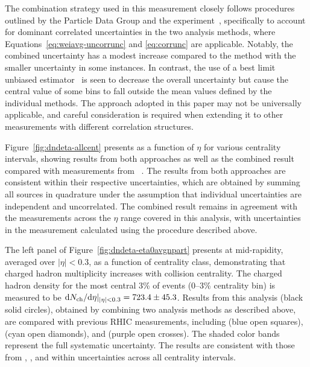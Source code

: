 The combination strategy used in this measurement closely follows procedures outlined by the Particle Data Group and the \cms experiment~\cite{ParticleDataGroup:2024cfk, CMS:2011aqh}, specifically to account for dominant correlated uncertainties in the two analysis methods, where Equations~\ref{eq:weiavg-uncorrunc} and \ref{eq:corrunc} are applicable. Notably, the combined uncertainty has a modest increase compared to the method with the smaller uncertainty in some instances. In contrast, the use of a best limit unbiased estimator~\cite{5f88760e-8167-31ed-9022-4d8c4dafd76a} is seen to decrease the overall uncertainty but cause the central value of some bins to fall outside the mean values defined by the individual methods. The approach adopted in this paper may not be universally applicable, and careful consideration is required when extending it to other measurements with different correlation structures.

Figure~\ref{fig:dndeta-allcent} presents \dndeta as a function of $\eta$ for various centrality intervals, showing results from both approaches as well as the combined result compared with measurements from \phobos~\cite{PHOBOS:2010eyu}. The results from both approaches are consistent within their respective uncertainties, which are obtained by summing all sources in quadrature under the assumption that individual uncertainties are independent and uncorrelated. The combined result remains in agreement with the \phobos measurements across the $\eta$ range covered in this analysis, with uncertainties in the \sphenix measurement calculated using the procedure described above.

The left panel of Figure~\ref{fig:dndeta-eta0avgnpart} presents \dndeta at mid-rapidity, averaged over $|\eta|<0.3$, as a function of centrality class, demonstrating that charged hadron multiplicity increases with collision centrality. The charged hadron density for the most central 3\% of events (0–3\% centrality bin) is measured to be $\mbox{d$N_{\rm ch}$/d$\eta$}|_{|\eta| < 0.3} = 723.4 \pm 45.3$.
Results from this analysis (black solid circles), obtained by combining two analysis methods as described above, are compared with previous RHIC measurements, including \phobos (blue open squares), \phenix (cyan open diamonds), and \brahms (purple open crosses). The shaded color bands represent the full systematic uncertainty. The \sphenix results are consistent with those from \phobos, \phenix, and \brahms within uncertainties across all centrality intervals. 

